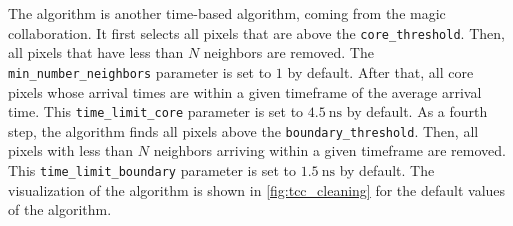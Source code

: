 The \tcc{} algorithm is another time-based algorithm, coming from the \gls{magic} collaboration.
It first selects all pixels that are above the \texttt{core\_threshold}. Then, all pixels that have
less than \(N\) neighbors are removed. The \texttt{min\_number\_neighbors} parameter is set to \(\num{1}\) by default.
After that, all core pixels whose arrival times are within a given timeframe of the average arrival time.
This \texttt{time\_limit\_core} parameter is set to \(\SI{4.5}{\nano\second}\) by default. As a fourth step,
the \tcc{} algorithm finds all pixels above the \texttt{boundary\_threshold}. Then, all pixels with
less than \(N\) neighbors arriving within a given timeframe are removed. This \texttt{time\_limit\_boundary}
parameter is set to \(\SI{1.5}{\nano\second}\) by default. The visualization of the algorithm is shown in
\autoref{fig:tcc_cleaning} for the default values of the algorithm.


